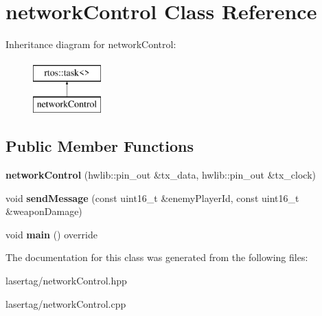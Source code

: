 \hypertarget{classnetwork_control}{}\section{network\+Control Class Reference}
\label{classnetwork_control}
Inheritance diagram for network\+Control\+:\begin{figure}[H]
\begin{center}
\leavevmode
\includegraphics[height=2.000000cm]{classnetwork_control}
\end{center}
\end{figure}
\subsection*{Public Member Functions}
\begin{DoxyCompactItemize}
\item 
\mbox{\label{classnetwork_control_ae4f1edf1741a10c22b9d45b1c440e71f}} 
{\bfseries network\+Control} (hwlib\+::pin\+\_\+out \&tx\+\_\+data, hwlib\+::pin\+\_\+out \&tx\+\_\+clock)
\item 
\mbox{\label{classnetwork_control_a9aa41c3c526efd9c21ca95a47a5af39a}} 
void {\bfseries send\+Message} (const uint16\+\_\+t \&enemy\+Player\+Id, const uint16\+\_\+t \&weapon\+Damage)
\item 
\mbox{\label{classnetwork_control_a8a562a0982afd0fe74b7140cf2fd6663}} 
void {\bfseries main} () override
\end{DoxyCompactItemize}


The documentation for this class was generated from the following files\+:\begin{DoxyCompactItemize}
\item 
lasertag/network\+Control.\+hpp\item 
lasertag/network\+Control.\+cpp\end{DoxyCompactItemize}
